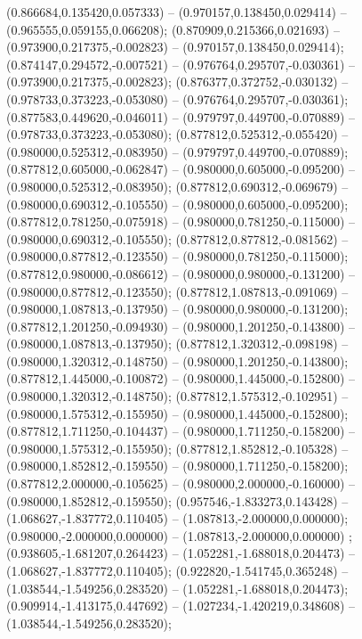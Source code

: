  (0.866684,0.135420,0.057333) -- (0.970157,0.138450,0.029414) -- (0.965555,0.059155,0.066208);
 (0.870909,0.215366,0.021693) -- (0.973900,0.217375,-0.002823) -- (0.970157,0.138450,0.029414);
 (0.874147,0.294572,-0.007521) -- (0.976764,0.295707,-0.030361) -- (0.973900,0.217375,-0.002823);
 (0.876377,0.372752,-0.030132) -- (0.978733,0.373223,-0.053080) -- (0.976764,0.295707,-0.030361);
 (0.877583,0.449620,-0.046011) -- (0.979797,0.449700,-0.070889) -- (0.978733,0.373223,-0.053080);
 (0.877812,0.525312,-0.055420) -- (0.980000,0.525312,-0.083950) -- (0.979797,0.449700,-0.070889);
 (0.877812,0.605000,-0.062847) -- (0.980000,0.605000,-0.095200) -- (0.980000,0.525312,-0.083950);
 (0.877812,0.690312,-0.069679) -- (0.980000,0.690312,-0.105550) -- (0.980000,0.605000,-0.095200);
 (0.877812,0.781250,-0.075918) -- (0.980000,0.781250,-0.115000) -- (0.980000,0.690312,-0.105550);
 (0.877812,0.877812,-0.081562) -- (0.980000,0.877812,-0.123550) -- (0.980000,0.781250,-0.115000);
 (0.877812,0.980000,-0.086612) -- (0.980000,0.980000,-0.131200) -- (0.980000,0.877812,-0.123550);
 (0.877812,1.087813,-0.091069) -- (0.980000,1.087813,-0.137950) -- (0.980000,0.980000,-0.131200);
 (0.877812,1.201250,-0.094930) -- (0.980000,1.201250,-0.143800) -- (0.980000,1.087813,-0.137950);
 (0.877812,1.320312,-0.098198) -- (0.980000,1.320312,-0.148750) -- (0.980000,1.201250,-0.143800);
 (0.877812,1.445000,-0.100872) -- (0.980000,1.445000,-0.152800) -- (0.980000,1.320312,-0.148750);
 (0.877812,1.575312,-0.102951) -- (0.980000,1.575312,-0.155950) -- (0.980000,1.445000,-0.152800);
 (0.877812,1.711250,-0.104437) -- (0.980000,1.711250,-0.158200) -- (0.980000,1.575312,-0.155950);
 (0.877812,1.852812,-0.105328) -- (0.980000,1.852812,-0.159550) -- (0.980000,1.711250,-0.158200);
 (0.877812,2.000000,-0.105625) -- (0.980000,2.000000,-0.160000) -- (0.980000,1.852812,-0.159550);
 (0.957546,-1.833273,0.143428) -- (1.068627,-1.837772,0.110405) -- (1.087813,-2.000000,0.000000);
 (0.980000,-2.000000,0.000000) -- (1.087813,-2.000000,0.000000) ;
 (0.938605,-1.681207,0.264423) -- (1.052281,-1.688018,0.204473) -- (1.068627,-1.837772,0.110405);
 (0.922820,-1.541745,0.365248) -- (1.038544,-1.549256,0.283520) -- (1.052281,-1.688018,0.204473);
 (0.909914,-1.413175,0.447692) -- (1.027234,-1.420219,0.348608) -- (1.038544,-1.549256,0.283520);
